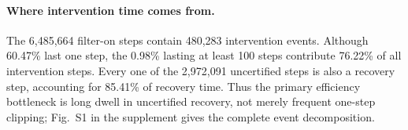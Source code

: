 \paragraph{Where intervention time comes from.}
The 6,485,664 filter-on steps contain 480,283 intervention events. Although
60.47\% last one step, the 0.98\% lasting at least 100 steps contribute
76.22\% of all intervention steps. Every one of the 2,972,091 uncertified
steps is also a recovery step, accounting for 85.41\% of recovery time.
Thus the primary efficiency bottleneck is long dwell in uncertified recovery,
not merely frequent one-step clipping; Fig.~S1 in the supplement gives the
complete event decomposition.
